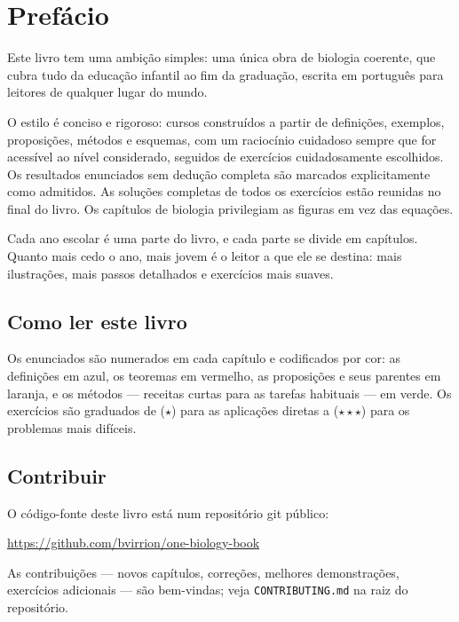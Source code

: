 \chapter{Prefácio}

Este livro tem uma ambição simples: uma única obra de biologia
coerente, que cubra tudo da educação infantil ao fim da graduação,
escrita em português para leitores de qualquer lugar do mundo.

O estilo é conciso e rigoroso: cursos construídos a partir de
definições, exemplos, proposições, métodos e esquemas, com um raciocínio
cuidadoso sempre que for acessível ao nível considerado, seguidos de
exercícios cuidadosamente escolhidos. Os resultados enunciados sem dedução
completa são marcados explicitamente como admitidos. As soluções completas de
todos os exercícios estão reunidas no final do livro. Os capítulos de biologia
privilegiam as figuras em vez das equações.

Cada ano escolar é uma parte do livro, e cada parte se divide em
capítulos. Quanto mais cedo o ano, mais jovem é o leitor a que
ele se destina: mais ilustrações, mais passos detalhados e
exercícios mais suaves.

\section*{Como ler este livro}

Os enunciados são numerados em cada capítulo e codificados por
cor: as definições em azul, os teoremas em vermelho, as proposições
e seus parentes em laranja, e os métodos --- receitas curtas para as
tarefas habituais --- em verde. Os exercícios são graduados de
($\star$) para as aplicações diretas a ($\star\star\star$) para os
problemas mais difíceis.

\section*{Contribuir}

O código-fonte deste livro está num repositório git público:
\begin{center}
\url{https://github.com/bvirrion/one-biology-book}
\end{center}
As contribuições --- novos capítulos, correções, melhores
demonstrações, exercícios adicionais --- são bem-vindas; veja
\texttt{CONTRIBUTING.md} na raiz do repositório.
